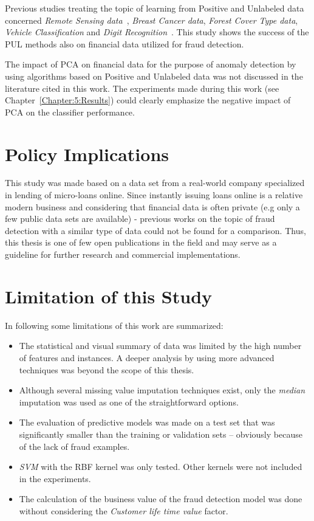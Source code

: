 Previous studies treating the topic of learning from Positive and Unlabeled data concerned \textit{Remote Sensing data}~\cite{Li:2011}, \textit{Breast Cancer data}, \textit{Forest Cover Type data}, \textit{Vehicle Classification} and \textit{Digit Recognition}~\cite{Claesen:2014}. This study shows the success of the PUL methods also on financial data utilized for fraud detection.

The impact of PCA on financial data for the purpose of anomaly detection by using algorithms based on Positive and Unlabeled data was not discussed in the literature cited in this work. The experiments made during this work (see Chapter~\ref{Chapter:5:Results}) could clearly emphasize the negative impact of PCA on the classifier performance.

\section{Policy Implications}\label{ch:pi}
    
This study was made based on a data set from a real-world company specialized in lending of micro-loans online. Since instantly issuing loans online is a relative modern business and considering that financial data is often private (e.g only a few public data sets are available) - previous works on the topic of fraud detection with a similar type of data could not be found for a comparison. Thus, this thesis is one of few open publications in the field and may serve as a guideline for further research and commercial implementations.

\section{Limitation of this Study}\label{ch:lim}

In following some limitations of this work are summarized:

\begin{itemize}  

    \item The statistical and visual summary of data was limited by the high number of features and instances. A deeper analysis by using more advanced techniques was beyond the scope of this thesis.
    
    \item Although several missing value imputation techniques exist, only the \textit{median} imputation was used as one of the straightforward options.

    \item The evaluation of predictive models was made on a test set that was significantly smaller than the training or validation sets -- obviously because of the lack of fraud examples.
    
    \item \textit{SVM} with the RBF kernel was only tested. Other kernels were not included in the experiments.
    
    \item The calculation of the business value of the fraud detection model was done without considering the \textit{Customer life time value} factor.
\end{itemize}

